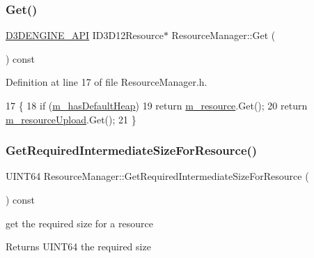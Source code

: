 \subsubsection{\texorpdfstring{Get()}{Get()}}
{\footnotesize\ttfamily \mbox{\hyperlink{stdafx_8h_a8ee2d990c5dfba7794dd2b60741d7722}{D3\+D\+E\+N\+G\+I\+N\+E\+\_\+\+A\+PI}} I\+D3\+D12\+Resource$\ast$ Resource\+Manager\+::\+Get (\begin{DoxyParamCaption}{ }\end{DoxyParamCaption}) const\hspace{0.3cm}{\ttfamily [inline]}}



Definition at line 17 of file Resource\+Manager.\+h.


\begin{DoxyCode}
17                                               \{
18         \textcolor{keywordflow}{if} (\mbox{\hyperlink{class_resource_manager_ab6e43dce874459d3b2c422959158f0d3}{m\_hasDefaultHeap}})
19             \textcolor{keywordflow}{return} \mbox{\hyperlink{class_resource_manager_a2190eea97044904955f1fead12732be5}{m\_resource}}.Get();
20         \textcolor{keywordflow}{return} \mbox{\hyperlink{class_resource_manager_a5d2576312216c2e85631636f3e76c3b2}{m\_resourceUpload}}.Get();
21     \}
\end{DoxyCode}
\mbox{\label{class_resource_manager_a6dd8fde1b39e245774f8a7120d7e3c99}} 
\subsubsection{\texorpdfstring{Get\+Required\+Intermediate\+Size\+For\+Resource()}{GetRequiredIntermediateSizeForResource()}}
{\footnotesize\ttfamily U\+I\+N\+T64 Resource\+Manager\+::\+Get\+Required\+Intermediate\+Size\+For\+Resource (\begin{DoxyParamCaption}{ }\end{DoxyParamCaption}) const}



get the required size for a resource 

\begin{DoxyReturn}{Returns}
U\+I\+N\+T64 the required size 
\end{DoxyReturn}


